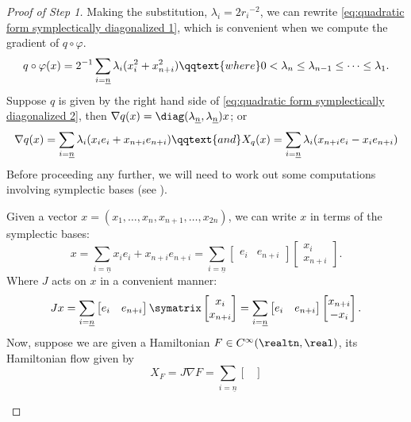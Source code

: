 \documentclass[../main-v2-manifolds.tex]{subfiles}
\begin{document}
\begin{proof}[Proof of Step 1]
    Making the substitution, $\lambda_i = 2{r_i}^{-2}$, we can rewrite \cref{eq:quadratic form symplectically diagonalized 1}, which is convenient when we compute the gradient of $q\circ\varphi$.
\begin{equation}
    q\circ\varphi(x) = 2^{-1}\sum_{i=\underline{n}}\lambda_i(x_i^2 + x_{n+i}^2)\qqtext{where} 0<\lambda_n\leq\lambda_{n-1}\leq\cdots\leq\lambda_1.
    \label{eq:quadratic form symplectically diagonalized 2}
\end{equation}
Suppose $q$ is given by the right hand side of \cref{eq:quadratic form symplectically diagonalized 2}, then $\nabla q(x) = \diag(\lambda_{\underline{n}},\lambda_{\underline{n}})x$; or
\[
    \nabla q(x) = \sum_{i=\underline{n}} \lambda_i(x_ie_i + x_{n+i}e_{n+i}) \qqtext{and}X_q(x) = \sum_{i=\underline{n}}\lambda_i(x_{n+i}e_i - x_ie_{n+i})
\]
Before proceeding any further, we will need to work out some computations involving symplectic bases (see \cite{Roman2007Advanced}).
\begin{note}
    Given a vector $x = (x_1, \ldots,x_n,x_{n+1},\ldots,x_{2n})$, we can write $x$ in terms of the symplectic bases:
    \[
        x = \sum_{i=\underline{n}} x_ie_i + x_{n+i}e_{n+i} = \sum_{i=\underline{n}} \begin{bmatrix}e_i & e_{n+i}\end{bmatrix} \begin{bmatrix}x_i \\ x_{n+i}\end{bmatrix}.
    \]
    Where $J$ acts on $x$ in a convenient manner:
    \[
        Jx = \sum_{i=\underline{n}}\begin{bmatrix}
            e_i & e_{n+i}
        \end{bmatrix}\symatrix \begin{bmatrix}
            x_i \\ x_{n+i}
        \end{bmatrix} = \sum_{i=\underline{n}}\begin{bmatrix}
            e_i & e_{n+i}
        \end{bmatrix}\begin{bmatrix}
            x_{n+i} \\ -x_{i}
        \end{bmatrix}.
    \]
    Now, suppose we are given a Hamiltonian $F\in C^\infty(\realtn,\real)$, its Hamiltonian flow given by
    \[
        X_F = J\nabla F = \sum_{i=\underline{n}}\begin{bmatrix}

\end{bmatrix}\]
\end{note}
\end{proof}
\end{document}
